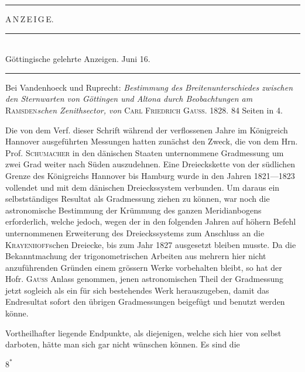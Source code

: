 \begin{center}\rule{.24\textwidth}{.4pt}\end{center}

\par\clearpage

\vspace*{.075\textheight}
\begin{center}{\LARGE A\,N\,Z\,E\,I\,G\,E.}\end{center}
\vspace{.045\textheight}
\begin{center}
\rule{.52\textwidth}{.4pt}\\[-.2ex]
{\small Göttingische gelehrte Anzeigen. Juni 16.}\\[-.2ex]
\rule{.52\textwidth}{.4pt}
\end{center}

Bei Vandenhoeck und Ruprecht: \textit{Bestimmung des Breitenunterschiedes
zwischen den Sternwarten von Göttingen und Altona durch Beobachtungen am}
\textsc{Ramsden}\textit{schen Zenithsector, von} \textsc{Carl Friedrich Gauss}.
1828. 84 Seiten in 4.

Die von dem Verf. dieser Schrift während der verflossenen Jahre im
Königreich Hannover ausgeführten Messungen hatten zunächst den Zweck, die
von dem Hrn. Prof. \textsc{Schumacher} in den dänischen Staaten unternommene
Gradmessung um zwei Grad weiter nach Süden auszudehnen. Eine Dreieckskette
von der südlichen Grenze des Königreichs Hannover bis Hamburg wurde
in den Jahren 1821---1823 vollendet und mit dem dänischen Dreieckssystem
verbunden. Um daraus ein selbstständiges Resultat als Gradmessung ziehen
zu können, war noch die astronomische Bestimmung der Krümmung des ganzen
Meridianbogens erforderlich, welche jedoch, wegen der in den folgenden
Jahren auf höhern Befehl unternommenen Erweiterung des Dreieckssystems
zum Anschluss an die \textsc{Krayenhoff}schen Dreiecke, bis zum Jahr 1827
ausgesetzt bleiben musste. Da die Bekanntmachung der trigonometrischen Arbeiten
aus mehrern hier nicht anzuführenden Gründen einem grössern Werke
vorbehalten bleibt, so hat der Hofr. \textsc{Gauss} Anlass genommen, jenen
astronomischen Theil der Gradmessung jetzt sogleich als ein für sich bestehendes
Werk herauszugeben, damit das Endresultat sofort den übrigen Gradmessungen
beigefügt und benutzt werden könne.

Vortheilhafter liegende Endpunkte, als diejenigen, welche sich hier von
selbst darboten, hätte man sich gar nicht wünschen können. Es sind die
\par\smallskip
\noindent\hfill \(8^{*}\)\hspace{.12\textwidth}\par


